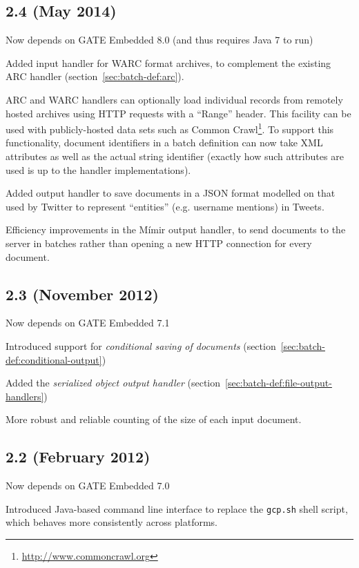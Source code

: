 \subsection{2.4 (May 2014)}

\bit
\item Now depends on GATE Embedded 8.0 (and thus requires Java 7 to run)
\item Added input handler for WARC format archives, to complement the existing
  ARC handler (section~\ref{sec:batch-def:arc}).
\item ARC and WARC handlers can optionally load individual records from
  remotely hosted archives using HTTP requests with a ``Range'' header.  This
  facility can be used with publicly-hosted data sets such as Common
  Crawl\footnote{\url{http://www.commoncrawl.org}}.  To support this
  functionality, document identifiers in a batch definition can now take XML
  attributes as well as the actual string identifier (exactly how such
  attributes are used is up to the handler implementations).
\item Added output handler to save documents in a JSON format modelled on that
  used by Twitter to represent ``entities'' (e.g. username mentions) in Tweets.
\item Efficiency improvements in the M\'{i}mir output handler, to send
  documents to the server in batches rather than opening a new HTTP connection
  for every document.
\eit

\subsection{2.3 (November 2012)}

\bit
\item Now depends on GATE Embedded 7.1
\item Introduced support for \emph{conditional saving of documents}
  (section~\ref{sec:batch-def:conditional-output})
\item Added the \emph{serialized object output handler}
  (section~\ref{sec:batch-def:file-output-handlers})
\item More robust and reliable counting of the size of each input document.
\eit

\subsection{2.2 (February 2012)}

\bit
\item Now depends on GATE Embedded 7.0
\item Introduced Java-based command line interface to replace the \verb|gcp.sh|
  shell script, which behaves more consistently across platforms.
\eit

